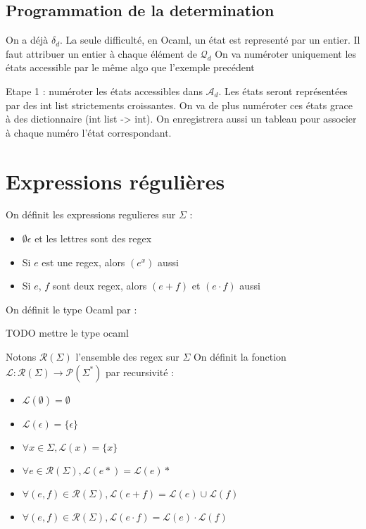 \subsection{Programmation de la determination}
On a déjà $\delta_d$. La seule difficulté, en Ocaml, un état est representé par un entier. Il faut attribuer un entier à chaque élément de $\mathcal{Q}_d$
On va numéroter uniquement les états accessible par le même algo que l'exemple precédent 

Etape 1 : numéroter les états accessibles dans $\mathcal{A}_d$. Les états seront représentées par des int list strictements croissantes.
On va de plus numéroter ces états grace à des dictionnaire (int list -> int). On enregistrera aussi un tableau pour associer à chaque numéro l'état correspondant.

\section{Expressions régulières}

\begin{definition}
    On définit les expressions regulieres sur $\Sigma$ :
    \begin{itemize}
        \item $\emptyset \epsilon$ et les lettres sont des regex
        \item Si $e$ est une regex, alors $(e^x)$ aussi
        \item Si $e$, $f$ sont deux regex, alors $(e+f)$ et $(e\cdot f)$ aussi
    \end{itemize}
\end{definition}

On définit le type Ocaml par :

TODO mettre le type ocaml

\begin{definition}
    Notons $\mathcal{R}(\Sigma)$ l'ensemble des regex sur $\Sigma$
    On définit la fonction $\mathcal{L}:\mathcal{R}(\Sigma)\rightarrow\mathcal{P}(\Sigma^*)$ par recursivité :
    \begin{itemize}
        \item $\mathcal{L}(\emptyset)=\emptyset$
        \item $\mathcal{L}(\epsilon)=\{\epsilon\}$
        \item $\forall x \in \Sigma, \mathcal{L}(x)=\{x\}$
        \item $\forall e \in \mathcal{R}(\Sigma),\mathcal{L}(e*)=\mathcal{L}(e)*$
        \item $\forall (e,f)\in \mathcal{R}(\Sigma), \mathcal{L}(e+f)=\mathcal{L}(e)\cup \mathcal{L}(f)$
        \item $\forall (e,f)\in \mathcal{R}(\Sigma), \mathcal{L}(e\cdot f)=\mathcal{L}(e)\cdot \mathcal{L}(f)$
    \end{itemize}
\end{definition}

